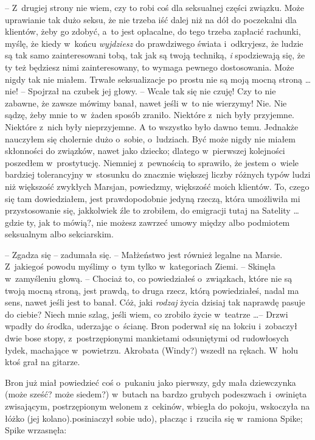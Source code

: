 \documentclass[oneside,polish,11pt,rmheadings]{mwbk}
\begin{document}
-- Z~drugiej strony nie wiem, czy to robi coś dla seksualnej części związku. Może uprawianie tak dużo seksu, że nie trzeba iść dalej niż na dół do poczekalni dla klientów, żeby go zdobyć, a~to jest opłacalne, do tego trzeba zapłacić rachunki, myślę, że kiedy w~końcu \textit{wyjdziesz } do prawdziwego świata i~odkryjesz, że ludzie są tak samo zainteresowani tobą, tak jak są twoją techniką, \textit{i }spodziewają się, że ty też będziesz nimi zainteresowany, to wymaga pewnego dostosowania. Może nigdy tak nie miałem. Trwałe seksualizacje po prostu nie są moją mocną stroną \ldots  nie! -- Spojrzał na czubek jej głowy. -- Wcale tak się nie czuję! Czy to nie zabawne, że zawsze mówimy banał, nawet jeśli w~to nie wierzymy! Nie. Nie sądzę, żeby mnie to w~żaden sposób zraniło. Niektóre z~nich były przyjemne. Niektóre z~nich były nieprzyjemne. A to wszystko było dawno temu. Jednakże nauczyłem się cholernie dużo o~sobie, o~ludziach. Być może nigdy nie miałem skłonności do związków, nawet jako dziecko; dlatego w~pierwszej kolejności poszedłem w~prostytucję. Niemniej z~pewnością to sprawiło, że jestem o~wiele bardziej tolerancyjny w~stosunku do znacznie większej liczby różnych typów ludzi niż większość zwykłych Marsjan, powiedzmy, większość moich klientów. To, czego się tam dowiedziałem, jest prawdopodobnie jedyną rzeczą, która umożliwiła mi przystosowanie się, jakkolwiek źle to zrobiłem, do emigracji tutaj na Satelity \ldots  gdzie ty, jak to mówią?, nie możesz zawrzeć umowy między albo podmiotem seksualnym albo sekciarskim. 

-- Zgadza się -- zadumała się. -- Małżeństwo jest również legalne na Marsie. Z~jakiegoś powodu myślimy o~tym tylko w~kategoriach Ziemi. -- Skinęła w~zamyśleniu głową. -- Chociaż to, co powiedziałeś o~związkach, które nie są twoją mocną stroną, jest prawdą, to druga rzecz, którą powiedziałeś, nadal ma sens, nawet jeśli jest to banał. Cóż, jaki \textit{rodzaj }życia dzisiaj tak naprawdę pasuje do ciebie? Niech mnie szlag, jeśli wiem, co zrobiło życie w~teatrze \ldots  -- Drzwi wpadły do środka, uderzając o~ścianę. Bron poderwał się na łokciu i~zobaczył dwie bose stopy, z~postrzępionymi mankietami odsuniętymi od rudowłosych łydek, machające w~powietrzu.  Akrobata (Windy?) wszedł na rękach. W~holu ktoś grał na gitarze. 

 Bron już miał powiedzieć coś o~pukaniu jako pierwszy, gdy mała dziewczynka (może sześć? może siedem?) w~butach na bardzo grubych podeszwach i~owinięta zwisającym, postrzępionym welonem z~cekinów, wbiegła do pokoju, wskoczyła na łóżko (jej kolano).posiniaczył sobie udo), płacząc i~rzuciła się w~ramiona Spike; Spike wrzasnęła:  
 
\end{document}
